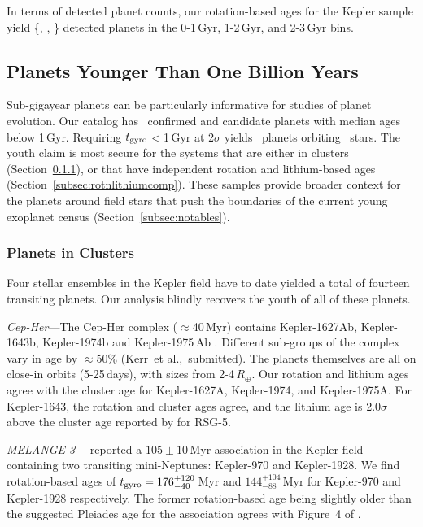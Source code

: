 \documentclass[11pt,twocolumn,tighten,linenumbers]{aastex63}
\begin{document}
In terms of detected planet counts, our rotation-based ages for the
Kepler sample yield \{\nplyounggyro, \nplmidgyro, \nploldgyro\}
detected planets in the 0-1\,Gyr, 1-2\,Gyr, and 2-3\,Gyr bins.  


\subsection{Planets Younger Than One Billion Years}

Sub-gigayear planets can be particularly informative for studies of
planet evolution.  Our catalog has \nplyounggyro\ confirmed and
candidate planets with median ages below 1\,Gyr.  Requiring $t_{\rm
gyro}$$<$1\,Gyr at 2$\sigma$ yields \nplyounggyrotwosigma\ planets
orbiting \nplhostsyounggyrotwosigma\ stars.  The youth claim is most
secure for the systems that are either in clusters (Section~\ref{subsec:clusterplanets}), or that have
independent rotation and lithium-based ages (Section~\ref{subsec:rotnlithiumcomp}).
These samples provide broader context for the planets around field
stars that push the boundaries of the current young exoplanet census
(Section~\ref{subsec:notables}).

\subsubsection{Planets in Clusters}
\label{subsec:clusterplanets}

Four stellar ensembles in the Kepler field have to date yielded a
total of fourteen transiting planets.  Our analysis blindly recovers
the youth of all of these planets.

{\it Cep-Her}---The Cep-Her complex ($\approx$40\,Myr) contains
Kepler-1627Ab, Kepler-1643b, Kepler-1974b and Kepler-1975\,Ab
\citep{Bouma_2022a,Bouma_2022b}.  Different sub-groups of the complex
vary in age by $\approx$50\% (Kerr~et al.,~submitted).  The planets
themselves are all on close-in orbits (5-25\,days), with sizes from
2-4\,$R_\oplus$.  Our rotation and lithium ages agree with the cluster
age for Kepler-1627A, Kepler-1974, and Kepler-1975A.  For Kepler-1643,
the rotation and cluster ages agree, and the lithium age is
2.0$\sigma$ above the cluster age reported by \citet{Bouma_2022b} for
RSG-5.

{\it MELANGE-3}---\citet{Barber_2022} reported a $105\pm10$\,Myr
association in the Kepler field containing two transiting
mini-Neptunes: Kepler-970 and Kepler-1928.  We find rotation-based
ages of $t_{\rm gyro}=176_{-40}^{+120}$\,Myr and
$144_{-88}^{+104}$\,Myr for Kepler-970 and Kepler-1928 respectively.
The former rotation-based age being slightly older than the suggested
Pleiades age for the association agrees with Figure~4 of
\citet{Barber_2022}.
\end{document}
